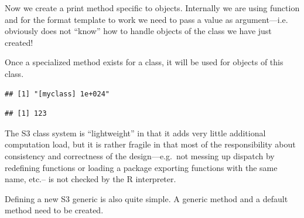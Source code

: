 \documentclass[krantz2]{krantz}\usepackage{knitr}%
\begin{document}
Now we create a print method specific to  objects. Internally we are using function  and for the format template to work we need to pass a  value as argument---i.e. obviously  does not ``know'' how to handle objects of the class we have just created!
\begin{knitrout}\footnotesize
{}\color{fgcolor}
\end{knitrout}

Once a specialized method exists for a class, it will be used for objects of this class.

\begin{knitrout}\footnotesize
{}\color{fgcolor}\begin{kframe}
\begin{alltt}
\end{alltt}
\begin{verbatim}
## [1] "[myclass] 1e+024"
\end{verbatim}
\begin{alltt}
\hlstd{(}
\end{alltt}
\begin{verbatim}
## [1] 123
\end{verbatim}
\end{kframe}
\end{knitrout}

The S3 class system is ``lightweight'' in that it adds very little additional computation load, but it is rather fragile in that most of the responsibility about consistency and correctness of the design---e.g.\ not messing up dispatch by redefining functions or loading a package exporting functions with the same name, etc.-- is not checked by the R interpreter.

Defining a new S3 generic is also quite simple. A generic method and a default method need to be created.

\begin{knitrout}\footnotesize
{}\color{fgcolor}\begin{kframe}
\begin{alltt}
 \hlkwb{<-}  \hlstd{(}\hlstd{,} \hlstd{) \{}
   \hlstd{(}
 \hlstd{\}}

 \hlkwb{<-} \hlstd{(}\hlstd{,} \hlstd{) \{}
   \hlstd{(}
\hlstd{\}}
\end{alltt}
\end{kframe}
\end{knitrout}
\end{document}
